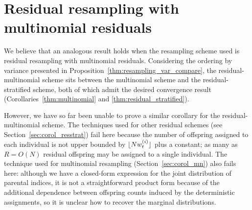 \section{Residual resampling with multinomial residuals}
We believe that an analogous result holds when the resampling scheme used is residual resampling with multinomial residuals. Considering the ordering by variance presented in Proposition~\ref{thm:resampling_var_compare}, the residual-multinomial scheme sits between the multinomial scheme and the residual-stratified scheme, both of which admit the desired convergence result (Corollaries~\ref{thm:multinomial} and \ref{thm:residual_stratified}).

However, we have so far been unable to prove a similar corollary for the residual-multinomial scheme.
The techniques used for other residual schemes (see Section~\ref{sec:corol_resstrat}) fail here because the number of offspring assigned to each individual is not upper bounded by $\lfloor N w_t^{(i)} \rfloor$ plus a constant; as many as $R = O(N)$ residual offspring may be assigned to a single individual.
The technique used for multinomial resampling (Section~\ref{sec:corol_mn}) also fails here: although we have a closed-form expression for the joint distribution of parental indices, it is not a straightforward product form because of the additional dependence between offspring counts induced by the deterministic assignments, so it is unclear how to recover the marginal distributions.

